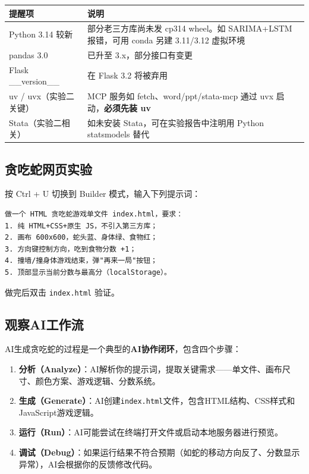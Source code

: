 \begin{table}[H]
\centering
\begin{tabular}{lp{10cm}}
\toprule
\textbf{提醒项} & \textbf{说明} \\
\midrule
Python 3.14 较新 & 部分老三方库尚未发 cp314 wheel。如 SARIMA+LSTM 报错，可用 conda 另建 3.11/3.12 虚拟环境 \\
pandas 3.0 & 已升至 3.x，部分接口有变更 \\
Flask \_\_version\_\_ & 在 Flask 3.2 将被弃用 \\
uv / uvx（实验二关键） & MCP 服务如 fetch、word/ppt/stata-mcp 通过 uvx 启动，\textbf{必须先装 uv} \\
Stata（实验二相关） & 如未安装 Stata，可在实验报告中注明用 Python statsmodels 替代 \\
\bottomrule
\end{tabular}
\end{table}

\subsection{贪吃蛇网页实验}

按 Ctrl + U 切换到 Builder 模式，输入下列提示词：

\begin{lstlisting}
做一个 HTML 贪吃蛇游戏单文件 index.html，要求：
1. 纯 HTML+CSS+原生 JS，不引入第三方库；
2. 画布 600x600，蛇头蓝、身体绿、食物红；
3. 方向键控制方向，吃到食物分数 +1；
4. 撞墙/撞身体游戏结束，弹"再来一局"按钮；
5. 顶部显示当前分数与最高分（localStorage）。
\end{lstlisting}

做完后双击 \texttt{index.html} 验证。

\subsection{观察AI工作流}

AI生成贪吃蛇的过程是一个典型的\textbf{AI协作闭环}，包含四个步骤：

\begin{enumerate}[leftmargin=2em]
  \item \textbf{分析（Analyze）}：AI解析你的提示词，提取关键需求——单文件、画布尺寸、颜色方案、游戏逻辑、分数系统。
  \item \textbf{生成（Generate）}：AI创建\texttt{index.html}文件，包含HTML结构、CSS样式和JavaScript游戏逻辑。
  \item \textbf{运行（Run）}：AI可能尝试在终端打开文件或启动本地服务器进行预览。
  \item \textbf{调试（Debug）}：如果运行结果不符合预期（如蛇的移动方向反了、分数显示异常），AI会根据你的反馈修改代码。
\end{enumerate}

